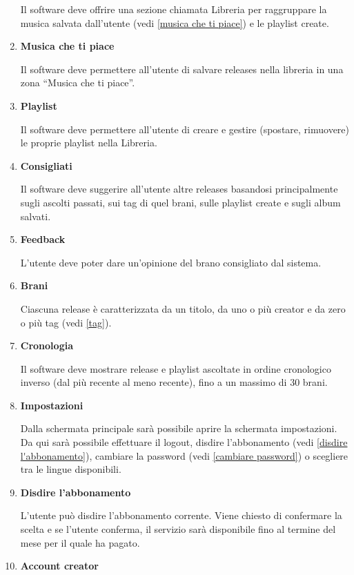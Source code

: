 \documentclass[a4paper,12pt]{article}
\begin{document}
\begin{enumerate}[label=\textbf{RF\arabic*}\;, ref=\textbf{RF\arabic*}]
    Il software deve offrire una sezione chiamata Libreria per raggruppare la musica salvata dall’utente (vedi \ref{musica che ti piace}) e le playlist create.

    \item \label{musica che ti piace} \textbf{Musica che ti piace}
    
    Il software deve permettere all’utente di salvare releases nella libreria in una zona “Musica che ti piace”.
    \item \label{playlist} \textbf{Playlist}
    
    Il software deve permettere all’utente di creare e gestire (spostare, rimuovere) le proprie playlist nella Libreria.
    \item \label{consigliati} \textbf{Consigliati}
    
    Il software deve suggerire all’utente altre releases basandosi principalmente sugli ascolti passati, sui tag di quel brani, sulle playlist create e sugli album salvati.
    \item \label{feedback} \textbf{Feedback}
    
    L’utente deve poter dare un’opinione del brano consigliato dal sistema.
    \item \label{brani} \textbf{Brani}
    
    Ciascuna release è caratterizzata da un titolo, da uno o più creator e da zero o più tag (vedi \ref{tag}).
    \item \label{cronologia} \textbf{Cronologia}
    
    Il software deve mostrare release e playlist ascoltate in ordine cronologico inverso (dal più recente al meno recente), fino a un massimo di 30 brani.
    \item \label{impostazioni} \textbf{Impostazioni}
    
    Dalla schermata principale sarà possibile aprire la schermata impostazioni. Da qui sarà possibile effettuare il logout, disdire l'abbonamento (vedi \ref{disdire l'abbonamento}), cambiare la password (vedi \ref{cambiare password}) o scegliere tra le lingue disponibili.
    \item \label{disdire l'abbonamento} \textbf{Disdire l'abbonamento}
    
    L'utente può disdire l'abbonamento corrente. Viene chiesto di confermare la scelta e se l’utente conferma, il servizio sarà disponibile fino al termine del mese per il quale ha pagato.
    \item \label{account creator} \textbf{Account creator}
    

\end{enumerate}
\end{document}
